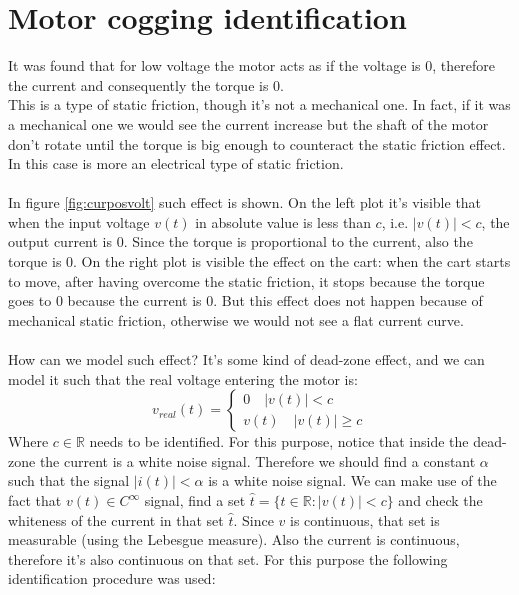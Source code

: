 \section{Motor cogging identification}
It was found that for low voltage the motor acts as if the voltage is $0$, therefore the current and consequently the torque is $0$.\\
This is  a type of static friction, though it's not a mechanical one. In fact, if it was a mechanical one we would see the current increase but the shaft of the motor don't rotate until the torque is big enough to counteract the static friction effect. In this case is more an electrical type of static friction.\\ \\
In figure \ref{fig:curposvolt} such effect is shown. On the left plot it's visible that when the input voltage $v(t)$ in absolute value is less than $c$, i.e. $|v(t)|< c$, the output current is $0$. Since the torque is proportional to the current, also the torque is $0$. On the right plot is visible the effect on the cart: when the cart starts to move, after having overcome the static friction, it stops because the torque goes to $0$ because the current is $0$. But this effect does not happen because of mechanical static friction, otherwise we would not see a flat current curve.  \\ \\
How can we model such effect? It's some kind of dead-zone effect, and we can model it such that the real voltage entering the motor is:
\begin{equation}
v_{real}(t) = \begin{cases}
0 \quad |v(t)| < c \\
v(t) \quad |v(t)| \geq c
\end{cases}
\end{equation}
Where $c \in \mathbb{R}$ needs to be identified. For this purpose, notice that inside the dead-zone the current is a white noise signal. Therefore we should find a constant $\alpha$ such that the signal $|i(t)| < \alpha$ is a white noise signal. We can make use of the fact that $v(t) \in C^{\infty}$ signal, find a set $\hat{t} = \{ t \in \mathbb{R}: |v(t)| < c \}$ and check the whiteness of the current in that set $\hat{t}$. Since $v$ is continuous, that set is measurable (using the Lebesgue measure). Also the current is continuous, therefore it's also continuous on that set. For this purpose the following identification procedure was used:
